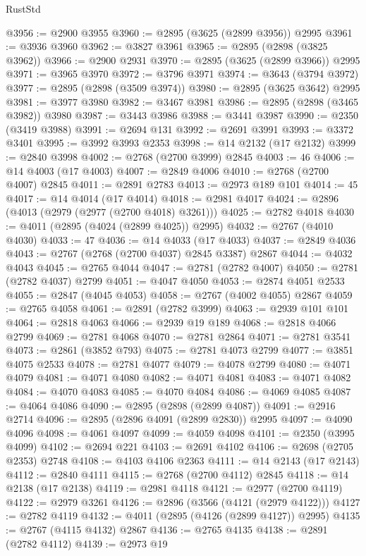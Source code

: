 \begin{lexlean}{RustStd}
\begin{coremodule}
@3956 := @2900 @3955
@3960 := @2895 (@3625 (@2899 @3956)) @2995
@3961 := @3936 @3960
@3962 := @3827 @3961
@3965 := @2895 (@2898 (@3825 @3962))
@3966 := @2900 @2931
@3970 := @2895 (@3625 (@2899 @3966)) @2995
@3971 := @3965 @3970
@3972 := @3796 @3971
@3974 := @3643 (@3794 @3972)
@3977 := @2895 (@2898 (@3509 @3974))
@3980 := @2895 (@3625 @3642) @2995
@3981 := @3977 @3980
@3982 := @3467 @3981
@3986 := @2895 (@2898 (@3465 @3982)) @3980
@3987 := @3443 @3986
@3988 := @3441 @3987
@3990 := @2350 (@3419 @3988)
@3991 := @2694 @131
@3992 := @2691 @3991
@3993 := @3372 @3401
@3995 := @3992 @3993 @2353
@3998 := @14 @2132 (@17 @2132)
@3999 := @2840 @3998
@4002 := @2768 (@2700 @3999) @2845
@4003 := 46
@4006 := @14 @4003 (@17 @4003)
@4007 := @2849 @4006
@4010 := @2768 (@2700 @4007) @2845
@4011 := @2891 @2783
@4013 := @2973 @189 @101
@4014 := 45
@4017 := @14 @4014 (@17 @4014)
@4018 := @2981 @4017
@4024 := @2896 (@4013 (@2979 (@2977 (@2700 @4018) @3261)))
@4025 := @2782 @4018
@4030 := @4011 (@2895 (@4024 (@2899 @4025)) @2995)
@4032 := @2767 (@4010 @4030)
@4033 := 47
@4036 := @14 @4033 (@17 @4033)
@4037 := @2849 @4036
@4043 := @2767 (@2768 (@2700 @4037) @2845 @3387) @2867
@4044 := @4032 @4043
@4045 := @2765 @4044
@4047 := @2781 (@2782 @4007)
@4050 := @2781 (@2782 @4037) @2799
@4051 := @4047 @4050
@4053 := @2874 @4051 @2533
@4055 := @2847 (@4045 @4053)
@4058 := @2767 (@4002 @4055) @2867
@4059 := @2765 @4058
@4061 := @2891 (@2782 @3999)
@4063 := @2939 @101 @101
@4064 := @2818 @4063
@4066 := @2939 @19 @189
@4068 := @2818 @4066 @2799
@4069 := @2781 @4068
@4070 := @2781 @2864
@4071 := @2781 @3541
@4073 := @2861 (@3852 @793)
@4075 := @2781 @4073 @2799
@4077 := @3851 @4075 @2533
@4078 := @2781 @4077
@4079 := @4078 @2799
@4080 := @4071 @4079
@4081 := @4071 @4080
@4082 := @4071 @4081
@4083 := @4071 @4082
@4084 := @4070 @4083
@4085 := @4070 @4084
@4086 := @4069 @4085
@4087 := @4064 @4086
@4090 := @2895 (@2898 (@2899 @4087))
@4091 := @2916 @2714
@4096 := @2895 (@2896 @4091 (@2899 @2830)) @2995
@4097 := @4090 @4096
@4098 := @4061 @4097
@4099 := @4059 @4098
@4101 := @2350 (@3995 @4099)
@4102 := @2694 @221
@4103 := @2691 @4102
@4106 := @2698 (@2705 @2353) @2748
@4108 := @4103 @4106 @2363
@4111 := @14 @2143 (@17 @2143)
@4112 := @2840 @4111
@4115 := @2768 (@2700 @4112) @2845
@4118 := @14 @2138 (@17 @2138)
@4119 := @2981 @4118
@4121 := @2977 (@2700 @4119)
@4122 := @2979 @3261
@4126 := @2896 (@3566 (@4121 (@2979 @4122)))
@4127 := @2782 @4119
@4132 := @4011 (@2895 (@4126 (@2899 @4127)) @2995)
@4135 := @2767 (@4115 @4132) @2867
@4136 := @2765 @4135
@4138 := @2891 (@2782 @4112)
@4139 := @2973 @19

\end{coremodule}
\end{lexlean}
